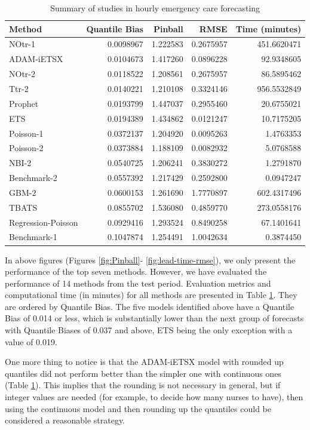 \documentclass[]{elsarticle} %
\begin{document}
\begin{table}[!h]

\caption{\label{tab:tab-results}Summary of studies in hourly emergency care forecasting}
\centering
\fontsize{9}{11}\selectfont
\begin{tabular}[t]{lrrrr}
\toprule
Method & Quantile Bias & Pinball & RMSE & Time (minutes)\\
\midrule
NOtr-1 & 0.0098967 & 1.222583 & 0.2675957 & 451.6620471\\
ADAM-iETSX & 0.0104673 & 1.417260 & 0.0896228 & 92.9348605\\
NOtr-2 & 0.0118522 & 1.208561 & 0.2675957 & 86.5895462\\
Ttr-2 & 0.0140221 & 1.210108 & 0.3324146 & 956.5532849\\
Prophet & 0.0193799 & 1.447037 & 0.2955460 & 20.6755021\\
ETS & 0.0194389 & 1.434862 & 0.0121247 & 10.7175205\\
Poisson-1 & 0.0372137 & 1.204920 & 0.0095263 & 1.4763353\\
Poisson-2 & 0.0373884 & 1.188109 & 0.0082932 & 5.0768588\\
NBI-2 & 0.0540725 & 1.206241 & 0.3830272 & 1.2791870\\
Benchmark-2 & 0.0557392 & 1.217429 & 0.2592800 & 0.0947247\\
GBM-2 & 0.0600153 & 1.261690 & 1.7770897 & 602.4317496\\
TBATS & 0.0855702 & 1.536080 & 0.4859770 & 273.0558176\\
Regression-Poisson & 0.0929416 & 1.293524 & 0.8490258 & 67.1401641\\
Benchmark-1 & 0.1047874 & 1.254491 & 1.0042634 & 0.3874450\\
\bottomrule
\end{tabular}
\end{table}

In above figures (Figures \ref{fig:Pinball}- \ref{fig:lead-time-rmse}), we only present the performance of the top seven methods. However, we have evaluated the performance of 14 methods from the test period. Evaluation metrics and computational time (in minutes) for all methods are presented in Table \ref{tab:tab-results}. They are ordered by Quantile Bias. The five models identified above have a Quantile Bias of 0.014 or less, which is substantially lower than the next group of forecasts with Quantile Biases of 0.037 and above, ETS being the only exception with a value of 0.019.

One more thing to notice is that the ADAM-iETSX model with rounded up quantiles did not perform better than the simpler one with continuous ones (Table \ref{tab:tab-results}). This implies that the rounding is not necessary in general, but if integer values are needed (for example, to decide how many nurses to have), then using the continuous model and then rounding up the quantiles could be considered a reasonable strategy.
\end{document}

